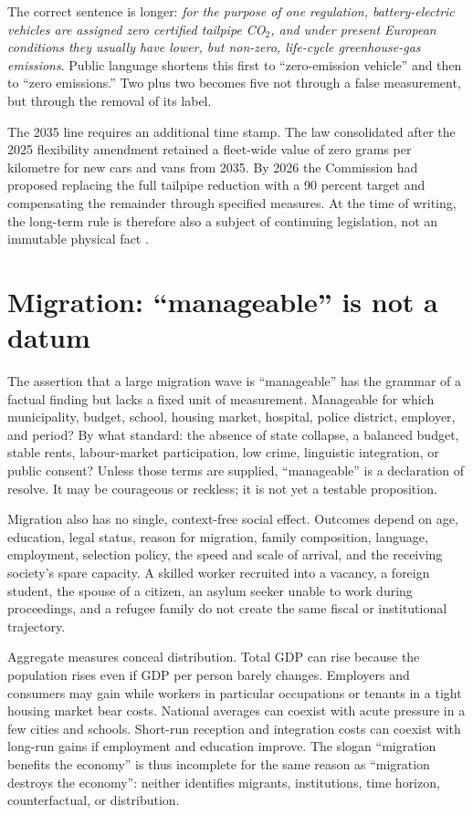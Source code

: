 ﻿\documentclass[12pt,a4paper]{book}
\begin{document}
The correct sentence is longer: \emph{for the purpose of one regulation,
battery-electric vehicles are assigned zero certified tailpipe CO$_2$, and
under present European conditions they usually have lower, but non-zero,
life-cycle greenhouse-gas emissions}.  Public language shortens this first to
``zero-emission vehicle'' and then to ``zero emissions.''  Two plus two becomes
five not through a false measurement, but through the removal of its label.

The 2035 line requires an additional time stamp.  The law consolidated after
the 2025 flexibility amendment retained a fleet-wide value of zero grams per
kilometre for new cars and vans from 2035.  By 2026 the Commission had proposed
replacing the full tailpipe reduction with a 90 percent target and compensating
the remainder through specified measures.  At the time of writing, the
long-term rule is therefore also a subject of continuing legislation, not an
immutable physical fact \cite{EUCarCO2Standards}.

\section{Migration: ``manageable'' is not a datum}

The assertion that a large migration wave is ``manageable'' has the grammar of
a factual finding but lacks a fixed unit of measurement.  Manageable for which
municipality, budget, school, housing market, hospital, police district,
employer, and period?  By what standard: the absence of state collapse, a
balanced budget, stable rents, labour-market participation, low crime,
linguistic integration, or public consent?  Unless those terms are supplied,
``manageable'' is a declaration of resolve.  It may be courageous or reckless;
it is not yet a testable proposition.

Migration also has no single, context-free social effect.  Outcomes depend on
age, education, legal status, reason for migration, family composition,
language, employment, selection policy, the speed and scale of arrival, and
the receiving society's spare capacity.  A skilled worker recruited into a
vacancy, a foreign student, the spouse of a citizen, an asylum seeker unable to
work during proceedings, and a refugee family do not create the same fiscal or
institutional trajectory.

Aggregate measures conceal distribution.  Total GDP can rise because the
population rises even if GDP per person barely changes.  Employers and
consumers may gain while workers in particular occupations or tenants in a
tight housing market bear costs.  National averages can coexist with acute
pressure in a few cities and schools.  Short-run reception and integration
costs can coexist with long-run gains if employment and education improve.
The slogan ``migration benefits the economy'' is thus incomplete for the same
reason as ``migration destroys the economy'': neither identifies migrants,
institutions, time horizon, counterfactual, or distribution.
\end{document}
